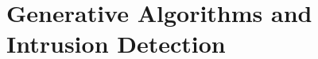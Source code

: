 \documentclass[../main.tex]{subfiles}
\begin{document}





\section{Generative Algorithms and Intrusion Detection}
\end{document}
